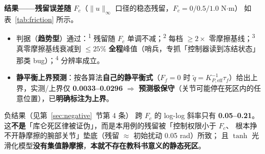 \documentclass[11pt,a4paper]{ctexart}
\newcommand{\stage}[1]{\textsuperscript{#1}}
\begin{document}
\textbf{结果——残留误差随 $F_c$}（$\|u\|_\infty$ 口径的稳态残留，$F_c=0/0.5/1.0$ N$\cdot$m）
如表~\ref{tab:friction} 所示。

\begin{table}[H]
\centering
\small
\caption{未补偿摩擦下的残留误差与守卫（$F_c=0/0.5/1.0$ N$\cdot$m）}\label{tab:friction}
\setlength{\tabcolsep}{4pt}
\end{table}

\begin{itemize}[leftmargin=1.6em,itemsep=2pt]
\item 判据（\textbf{趋势型}）通过：\stage{1} 残留随 $F_c$ 单调不减；\stage{2} 每档 $\ge2\times$
  零摩擦基线；\stage{3} 真零摩擦基线衰减到 $\le25\%$ \textbf{全程}峰值（哨兵，专抓「控制器读到冻结状态」
  那类 bug）；\stage{4} 分辨率成立。
\item \textbf{静平衡上界预测}：按各算法\textbf{自己的静平衡式}（$F_f=0$ 时
  $\tilde q=K_{P,\mathrm{eff}}^{-1}\tau_f$）给出上界，实测/上界仅 \textbf{0.0033--0.0296}
  $\Rightarrow$ \textbf{预测极保守}（关节可能停在死区内的任意位置），已\textbf{明确标注为上界}。
\end{itemize}

\begin{warnbox}{负结果（见第~\ref{sec:negative}~节第 4 条）}
跨 $F_c$ 的 log-log 斜率只有 \textbf{0.05--0.21}。
这\textbf{不是}「库仑死区律被证伪」，而是本用例的残留被「控制权限小于 $F_c$、
根本挣不开静摩擦的腕部关节」垫底（残留 $\approx$ 初始扰动 0.05 rad）所致；
且 $\tanh$ 光滑化模型\textbf{没有集值静摩擦}，\textbf{本就不存在教科书意义的静态死区}。
\end{warnbox}
\end{document}
